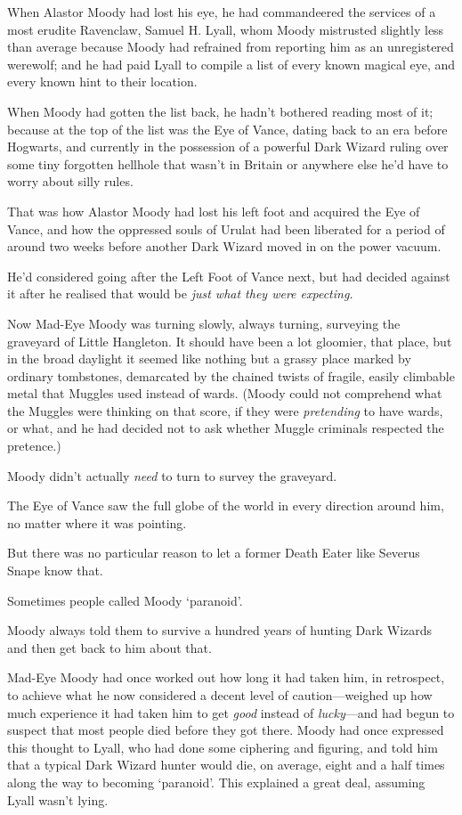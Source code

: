When Alastor Moody had lost his eye, he had commandeered the services of
a most erudite Ravenclaw, Samuel H. Lyall, whom Moody mistrusted
slightly less than average because Moody had refrained from reporting
him as an unregistered werewolf; and he had paid Lyall to compile a list
of every known magical eye, and every known hint to their location.

When Moody had gotten the list back, he hadn't bothered reading most of
it; because at the top of the list was the Eye of Vance, dating back to
an era before Hogwarts, and currently in the possession of a powerful
Dark Wizard ruling over some tiny forgotten hellhole that wasn't in
Britain or anywhere else he'd have to worry about silly rules.

That was how Alastor Moody had lost his left foot and acquired the Eye
of Vance, and how the oppressed souls of Urulat had been liberated for a
period of around two weeks before another Dark Wizard moved in on the
power vacuum.

He'd considered going after the Left Foot of Vance next, but had decided
against it after he realised that would be \emph{just what they were
expecting.}

Now Mad-Eye Moody was turning slowly, always turning, surveying the
graveyard of Little Hangleton. It should have been a lot gloomier, that
place, but in the broad daylight it seemed like nothing but a grassy
place marked by ordinary tombstones, demarcated by the chained twists of
fragile, easily climbable metal that Muggles used instead of wards.
(Moody could not comprehend what the Muggles were thinking on that
score, if they were \emph{pretending} to have wards, or what, and he had
decided not to ask whether Muggle criminals respected the pretence.)

Moody didn't actually \emph{need} to turn to survey the graveyard.

The Eye of Vance saw the full globe of the world in every direction
around him, no matter where it was pointing.

But there was no particular reason to let a former Death Eater like
Severus Snape know that.

Sometimes people called Moody `paranoid'.

Moody always told them to survive a hundred years of hunting Dark
Wizards and then get back to him about that.

Mad-Eye Moody had once worked out how long it had taken him, in
retrospect, to achieve what he now considered a decent level of
caution---weighed up how much experience it had taken him to get
\emph{good} instead of \emph{lucky}---and had begun to suspect that most
people died before they got there. Moody had once expressed this thought
to Lyall, who had done some ciphering and figuring, and told him that a
typical Dark Wizard hunter would die, on average, eight and a half times
along the way to becoming `paranoid'. This explained a great deal,
assuming Lyall wasn't lying.

